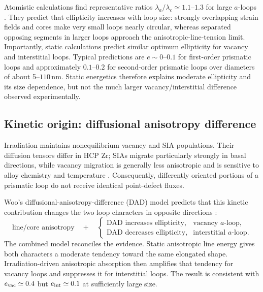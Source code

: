 \documentclass[11pt]{article}
\newcommand{\SI}[2]{\ensuremath{#1\,#2}}
\newcommand{\meter}{\mathrm{m}}
\newcommand{\nano}{\mathrm{n}}
\begin{document}
Atomistic calculations find representative ratios $\lambda_a/\lambda_c\simeq1.1$--$1.3$ for large $a$-loops \citep{Hulse2021Atomistic}. They predict that ellipticity increases with loop size: strongly overlapping strain fields and cores make very small loops nearly circular, whereas separated opposing segments in larger loops approach the anisotropic-line-tension limit. Importantly, static calculations predict similar optimum ellipticity for vacancy and interstitial loops. Typical predictions are $e\sim0$--$0.1$ for first-order prismatic loops and approximately $0.1$--$0.2$ for second-order prismatic loops over diameters of about 5--\SI{110}{\nano\meter}. Static energetics therefore explains moderate ellipticity and its size dependence, but not the much larger vacancy/interstitial difference observed experimentally.

\subsection{Kinetic origin: diffusional anisotropy difference}

Irradiation maintains nonequilibrium vacancy and SIA populations. Their diffusion tensors differ in HCP Zr; SIAs migrate particularly strongly in basal directions, while vacancy migration is generally less anisotropic and is sensitive to alloy chemistry and temperature \citep{Frank1988Defects,Woo1988Theory,Christiaen2021Influence}. Consequently, differently oriented portions of a prismatic loop do not receive identical point-defect fluxes.

Woo's diffusional-anisotropy-difference (DAD) model predicts that this kinetic contribution changes the two loop characters in opposite directions \citep{Woo1988Theory}:
\begin{equation}
 \text{line/core anisotropy}
 \quad+\quad
 \begin{cases}
   \text{DAD increases ellipticity}, & \text{vacancy }a\text{-loop},\\
   \text{DAD decreases ellipticity}, & \text{interstitial }a\text{-loop}.
 \end{cases}
 \label{eq:reconciliation}
\end{equation}
The combined model reconciles the evidence. Static anisotropic line energy gives both characters a moderate tendency toward the same elongated shape. Irradiation-driven anisotropic absorption then amplifies that tendency for vacancy loops and suppresses it for interstitial loops. The result is consistent with $e_{\rm vac}\simeq0.4$ but $e_{\rm int}\simeq0.1$ at sufficiently large size.
\end{document}
